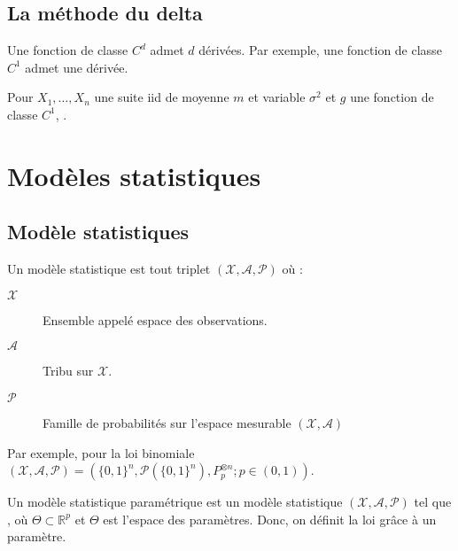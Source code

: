 \documentclass[10pt, french]{report}
\begin{document}
\begin{multicols*}{2}
\columnbreak
\section{La méthode du delta}
\begin{definitionNOHFILL}[Classe $C^{d}$]
Une fonction de classe $C^{d}$ admet $d$ dérivées. Par exemple, une fonction de classe $C^{1}$ admet une dérivée.
\end{definitionNOHFILL}

Pour $X_{1}, \dots, X_{n}$ une suite iid de moyenne $m$ et variable $\sigma^{2}$ et $g$ une fonction de classe $C^{1}$, .



\newpage
\chapter{Modèles statistiques}

\section{Modèle statistiques}
\begin{definitionNOHFILL}
Un modèle statistique est tout triplet $(\mathcal{X}, \mathcal{A}, \mathcal{P})$ où :
\begin{description}
	\item[$\mathcal{X}$]	Ensemble appelé espace des observations.
	\item[$\mathcal{A}$]	Tribu sur $\mathcal{X}$.
	\item[$\mathcal{P}$]	Famille de probabilités sur l'espace mesurable $(\mathcal{X}, \mathcal{A})$
\end{description}

Par exemple, pour la loi binomiale $(\mathcal{X}, \mathcal{A}, \mathcal{P}) = (\{0, 1\}^{n}, \mathcal{P}(\{0, 1\}^{n}), P_{p}^{\otimes n}; p \in (0, 1))$.

\begin{definitionNOHFILLsub}
Un modèle statistique paramétrique est un modèle statistique $(\mathcal{X}, \mathcal{A}, \mathcal{P})$ tel que , où $\Theta \subset \mathbb{R}^{p}$ et $\Theta$ est l'espace des paramètres. Donc, on définit la loi grâce à un paramètre. 
\end{definitionNOHFILLsub}
\end{definitionNOHFILL}



\end{multicols*}
\end{document}
